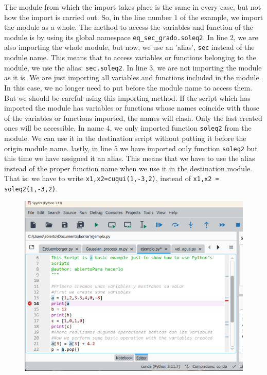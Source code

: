 \begin{paracol}{2}
The module from which the import takes place is the same in every case, but not how the import is carried out. So, in the line number $1$ of the example, we import the module as a whole. The method to access the variables and function of the module is by using its global namespace  \texttt{eq_sec_grado.soleq2}. In line $2$, we are also importing the whole module, but now, we use an 'alias', \texttt{sec} instead of the module name. This means that to access variables or functions belonging to the module, we use the alias: \texttt{sec.soleq2}. In line $3$, we are not importing the module as it is. We are just importing all variables and functions included in the module. In this case, we no longer need to put before the module name to access them.  But we should be careful using this importing method. If the script which has imported the module has variables or functions whose names coincide with those of the variables or functions imported, the names will clash. Only the last created ones will be accessible. In name $4$, we only imported function \texttt{soleq2} from the module. We can use it in the destination script without putting it before the origin module name. lastly, in line $5$  we have imported only function \texttt{soleq2} but this time we have assigned it an alias. This means that we have to use the alias instead of the proper function name when we use it in the destination module. That is: we have to write \texttt{x1,x2=cuqui(1,-3,2)}, instead of \texttt{x1,x2 = soleq2(1,-3,2)}.        
\end{paracol}
\begin{figure}[h]
    \centering
    \includegraphics[width=14cm]{figuras/error.png}
    \label{fig:depu0}
\end{figure}
